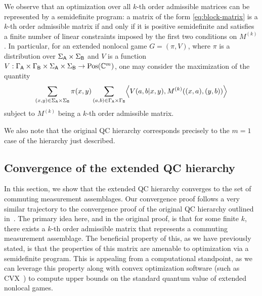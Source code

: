 We observe that an optimization over all $k$-th order admissible
matrices can be represented by a semidefinite program: a matrix of the form
\eqref{eq:block-matrix} is a $k$-th order admissible matrix if and only if it
is positive semidefinite and satisfies a finite number of linear constraints
imposed by the first two conditions on $M^{(k)}$.
In particular, for an extended nonlocal game $G = (\pi,V)$,
where $\pi$ is a distribution over $\Sigma_{\mathsf{A}} \times \Sigma_{\mathsf{B}}$ and $V$ is a function
$V: \Gamma_{\mathsf{A}} \times \Gamma_{\mathsf{B}} \times \Sigma_{\mathsf{A}} \times \Sigma_{\mathsf{B}} \rightarrow\mathrm{Pos}(\mathbb{C}^m)$, 
one may consider the maximization of the quantity
\begin{equation}
  \sum_{(x,y) \in \Sigma_{\mathsf{A}} \times \Sigma_{\mathsf{B}}} \pi(x,y) \sum_{(a,b) \in \Gamma_{\mathsf{A}} \times \Gamma_{\mathsf{B}}} \Bigl\langle V(a,b|x,y), M^{(k)}((x,a),(y,b)) \Bigr\rangle
\end{equation}
subject to $M^{(k)}$ being a $k$-th order admissible matrix.

We also note that the original QC hierarchy
corresponds precisely to the $m=1$ case of the hierarchy just described.

\subsection{Convergence of the extended QC hierarchy} \label{sec:convergence-of-the-extended-qc-hierarchy}

In this section, we show that the extended QC hierarchy converges to the set of commuting measurement assemblages. Our convergence proof follows a very similar trajectory to the convergence proof of the original QC hierarchy outlined in~\cite{Navascues2008}. The primary idea here, and in the original proof, is that for some finite $k$, there exists a $k$-th order admissible matrix that represents a commuting measurement assemblage. The beneficial property of this, as we have previously stated, is that the properties of this matrix are amenable to optimization via a semidefinite program. This is appealing from a computational standpoint, as we can leverage this property along with convex optimization software (such as CVX~\cite{Grant2008a}) to compute upper bounds on the standard quantum value of extended nonlocal games. 

